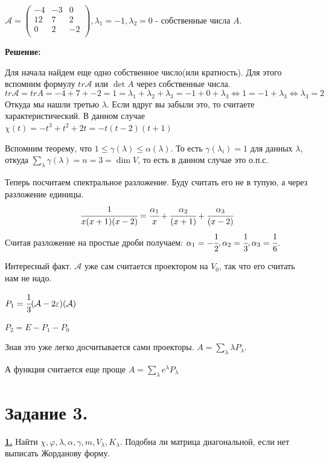 \documentclass{article}
\newcommand{\deff}[1]{\underline{\textbf{#1}}}
\begin{document}
$\mathcal{A} = \begin{pmatrix}
    -4 & -3 & 0 \\
    12 & 7 & 2 \\
    0 & 2 & -2 \\
\end{pmatrix}, \lambda_1 = -1, \lambda_2 = 0$ - собственные числа $A$.

\textbf{Решение:}

Для начала найдем еще одно собственное число(или кратность). Для этого вспомним формулу $tr \mathcal{A}$ или $\det A $ через собственные числа.
$$tr \mathcal{A} = tr A = -4 + 7 + -2 = 1 = \lambda_1 + \lambda_2 + \lambda_3 = -1 + 0 + \lambda_3 \Leftrightarrow 1 = -1 + \lambda_3 \Leftrightarrow \lambda_3 = 2$$
Откуда мы нашли третью $\lambda$. Если вдруг вы забыли это, то считаете характеристический. В данном случае $\chi(t) = 
-t^3+t^2+2t = -t(t-2)(t+1)$

Вспомним теорему, что $1\leq\gamma(\lambda)\leq\alpha(\lambda)$. То есть $\gamma(\lambda_i) = 1$ для данных $\lambda$, откуда $\sum\limits_{\lambda}\gamma(\lambda) = n = 3 = \dim V$, то есть в данном случае это о.п.с.

Теперь посчитаем спектральное разложение. Буду считать его не в тупую, а через разложение единицы.
$$\cfrac{1}{x(x+1)(x-2)} = \cfrac{\alpha_1}{x} + \cfrac{\alpha_2}{(x+1)} + \cfrac{\alpha_3}{(x-2)}$$
Считая разложение на простые дроби получаем:
$\alpha_1 = -\cfrac{1}{2}, \alpha_2 = \cfrac{1}{3}, \alpha_3 = \cfrac{1}{6}$. 

Интересный факт. $\mathcal{A}$ уже сам считается проектором на $V_{0}$, так что его считать нам не надо.

$P_{1} = \cfrac{1}{3} (\mathcal{A}- 2\varepsilon)(\mathcal{A})$

$P_2 = E-P_1-P_0 $

Зная это уже легко досчитывается сами проекторы. $A = \sum\limits_{\lambda}\lambda P_\lambda$.

А функция считается еще проще $A = \sum\limits_{\lambda} e^\lambda P_\lambda$

\newpage

\section{Задание 3.}

\deff{1.} Найти $\chi, \varphi,\lambda,\alpha,\gamma, m, V_{\lambda}, K_{\lambda}$. Подобна ли матрица диагональной, если нет выписать Жорданову форму.
\end{document}
